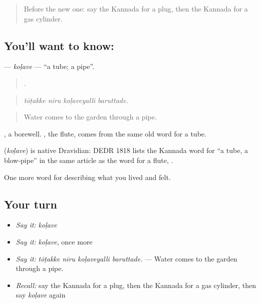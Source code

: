 \label{lesson:KA-C544-kolave}



\begin{quote}
Before the new one: say the Kannada for a plug, then the Kannada for a gas cylinder.
\end{quote}

\subsection*{You'll want to know: }
\textbf{} — \emph{koḷave} — \textquotedblleft{}a tube; a pipe\textquotedblright{}.

\begin{quote}
   .
\end{quote}

\begin{quote}
\emph{tōṭakke nīru koḷaveyalli baruttade.}
\end{quote}

\begin{quote}
Water comes to the garden through a pipe.
\end{quote}

 , a borewell. , the flute, comes from the same old word for a tube.

\begin{cousinweb}
\textbf{} (\emph{koḷave}) is native Dravidian: DEDR 1818 lists the Kannada word for \textquotedblleft{}a tube, a blow-pipe\textquotedblright{} in the same article as the word for a flute, .
\end{cousinweb}

\begin{grammarlens}[title={What you've built}]
One more word for describing what you lived and felt.
\end{grammarlens}

\subsection*{Your turn}
\begin{itemize}
\raggedright
  \item \emph{Say it:} \emph{koḷave}
  \item \emph{Say it:} \emph{koḷave}, once more
  \item \emph{Say it:} \emph{tōṭakke nīru koḷaveyalli baruttade.} — Water comes to the garden through a pipe.
  \item \emph{Recall:} say the Kannada for a plug, then the Kannada for a gas cylinder, then say \emph{koḷave} again
\end{itemize}

